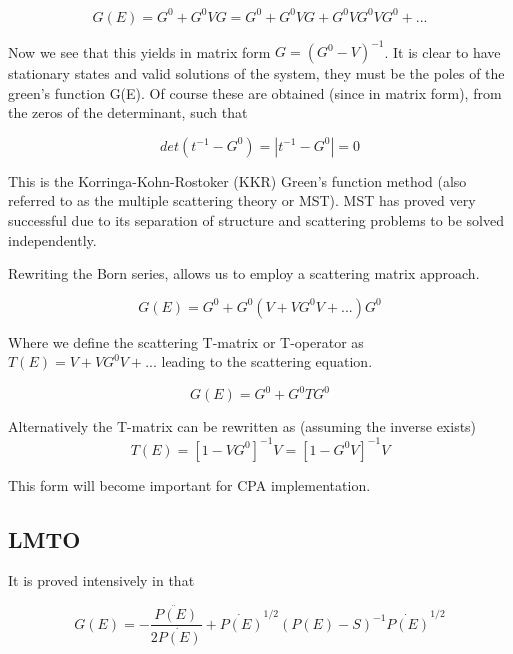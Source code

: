 \documentclass[12pt]{article}
\begin{document}
\begin{equation} \label{4.1} \tag{4.4}
G(E)=G^0+G^0VG=G^0+G^0VG+G^0VG^0VG^0+...
\end{equation}

Now we see that this yields in matrix form $G=(G^0-V)^{-1}$. It is clear to have stationary states and valid solutions of the system, they must be the poles of the green's function G(E). Of course these are obtained (since in matrix form), from the zeros of the determinant, such that

\begin{equation} \label{4.1} \tag{4.5}
det(t^{-1}-G^0)=|t^{-1}-G^0|=0
\end{equation}

This is the Korringa-Kohn-Rostoker (KKR) Green's function method (also referred to as the multiple scattering theory or MST). MST has proved very successful due to its separation of structure and scattering problems to be solved independently. 

Rewriting the Born series, allows us to employ a scattering matrix approach. 

\begin{equation} \label{4.1} \tag{4.6}
G(E)=G^0+G^0(V+VG^0V+...)G^0
\end{equation}

Where we define the scattering T-matrix or T-operator as $T(E)= V+VG^0V+...$ leading to the scattering equation.

\begin{equation} \label{4.1} \tag{4.7}
G(E)=G^0+G^0TG^0
\end{equation}

Alternatively the T-matrix can be rewritten as (assuming the inverse exists) 
\begin{equation} \label{4.1} \tag{4.8}
T(E)=[1-VG^0]^{-1}V=[1-G^0V]^{-1}V
\end{equation}

This form will become important for CPA implementation.

\subsection{LMTO}
It is proved intensively in \cite{turek} that 

\begin{equation} \label{4.1} \tag{4.9}
G(E) = - \frac{\ddot{P(E)}}{2\dot{P(E)}} + \dot{P(E)}^{1/2} (P(E)-S)^{-1} \dot{P(E)}^{1/2}
\end{equation}
\end{document}
